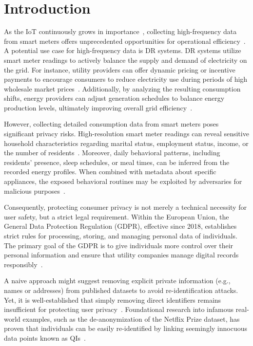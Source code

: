 \chapter{Introduction}

As the \ac{IoT} continuously grows in importance~\cite{reviewIoT}, collecting high-frequency data from smart meters offers unprecedented opportunities for operational efficiency~\cite{SmartMetersApplications}. A potential use case for high-frequency data is \ac{DR} systems. \ac{DR} systems utilize smart meter readings to actively balance the supply and demand of electricity on the grid. For instance, utility providers can offer dynamic pricing or incentive payments to encourage consumers to reduce electricity use during periods of high wholesale market prices~\cite{DemandResponseSurvey}. Additionally, by analyzing the resulting consumption shifts, energy providers can adjust generation schedules to balance energy production levels, ultimately improving overall grid efficiency~\cite{DemandResponseBenefits}.

However, collecting detailed consumption data from smart meters poses significant privacy risks. High-resolution smart meter readings can reveal sensitive household characteristics regarding marital status, employment status, income, or the number of residents~\cite{RevealingHouseholdCharacteristicsSM}. Moreover, daily behavioral patterns, including residents' presence, sleep schedules, or meal times, can be inferred from the recorded energy profiles. When combined with metadata about specific appliances, the exposed behavioral routines may be exploited by adversaries for malicious purposes~\cite{InferringPersonalInformationFromDRS,AshgarSurveyPaper}.

Consequently, protecting consumer privacy is not merely a technical necessity for user safety, but a strict legal requirement. Within the European Union, the General Data Protection Regulation (GDPR), effective since 2018, establishes strict rules for processing, storing, and managing personal data of individuals. The primary goal of the GDPR is to give individuals more control over their personal information and ensure that utility companies manage digital records responsibly~\cite{GDPR}.

A naive approach might suggest removing explicit private information (e.g., names or addresses) from published datasets to avoid re-identification attacks. Yet, it is well-established that simply removing direct identifiers remains insufficient for protecting user privacy~\cite{Sweeney_SimpleDemographics}. Foundational research into infamous real-world examples, such as the de-anonymization of the Netflix Prize dataset, has proven that individuals can be easily re-identified by linking seemingly innocuous data points known as \acp{QI}~\cite{NetflixPaper}.

